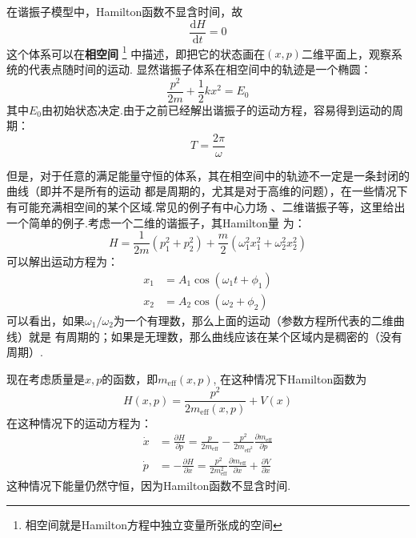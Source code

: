     \par 
    在谐振子模型中，Hamilton函数不显含时间，故
    \begin{equation}
        \frac {\mathrm{d}H}{\mathrm{d}t} = 0
    \end{equation}
    这个体系可以在\textbf{相空间}
    \footnote{相空间就是Hamilton方程中独立变量所张成的空间}
    中描述，即把它的状态画在$(x,p)$二维平面上，观察系统的代表点随时间的运动.
    显然谐振子体系在相空间中的轨迹是一个椭圆：
    \begin{equation}
        \frac{p^2}{2m} + \frac 12 kx^2 = E_0
    \end{equation}
    其中$E_0$由初始状态决定.由于之前已经解出谐振子的运动方程，容易得到运动的周期：
    \begin{equation}
        T = \frac{2\pi}{\omega}
    \end{equation}
    \par 
    但是，对于任意的满足能量守恒的体系，其在相空间中的轨迹不一定是一条封闭的曲线（即并不是所有的运动
    都是周期的，尤其是对于高维的问题），在一些情况下有可能充满相空间的某个区域.常见的例子有中心力场
    \cite{Landau2007mechanics}、二维谐振子等\cite{B2006经典力学的数学方法}，这里给出一个简单的例子.考虑一个二维的谐振子，其Hamilton量
    为：
    \begin{equation}
        H = \frac{1}{2m}(p_1^2 + p_2^2) + \frac{m}{2}(\omega_1^2x_1^2 + \omega_2^2x_2^2)
    \end{equation}
    可以解出运动方程为：
    \begin{equation}
        \begin{split}
            x_1 &= A_1\cos(\omega_1 t + \phi_1)\\
            x_2 &= A_2\cos(\omega_2 + \phi_2)
        \end{split}
    \end{equation}
    可以看出，如果$\omega_1 / \omega_2$为一个有理数，那么上面的运动（参数方程所代表的二维曲线）就是
    有周期的；如果是无理数，那么曲线应该在某个区域内是稠密的（没有周期）.
    \par
    现在考虑质量是$x,p$的函数，即$m_\mathrm{eff}(x,p)$, 在这种情况下Hamilton函数为
    \begin{equation}
        H(x,p) = \frac {p^2}{2m_\mathrm{eff}(x,p)} + V(x)
    \end{equation}
    在这种情况下的运动方程为：
    \begin{equation}
        \begin{split}
            \dot{x} &= \frac {\partial H}{\partial p} = \frac {p}{2m_{\mathrm{eff}}} - \frac {p^2}{2m_{\mathrm{eff}^2}} \frac {\partial m_\mathrm{eff}}{\partial p} \\
            \dot{p} &= -\frac {\partial H}{\partial x} = \frac {p^2}{2m_\mathrm{eff}^2} \frac {\partial m_\mathrm{eff}}{\partial x} + \frac {\partial V}{\partial x}
        \end{split}
    \end{equation}
    这种情况下能量仍然守恒，因为Hamilton函数不显含时间.
